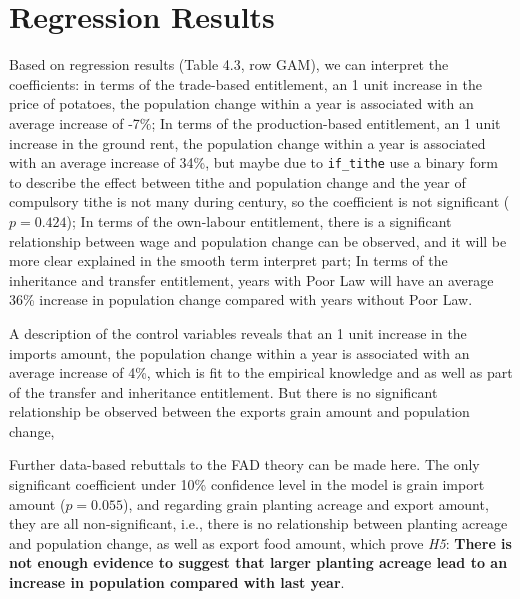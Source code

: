 \section{Regression Results}

Based on regression results (Table 4.3, row GAM), we can interpret the coefficients: in terms of the trade-based entitlement, an 1 unit increase in the price of potatoes, the population change within a year is associated with an average increase of -7\%; In terms of the production-based entitlement, an 1 unit increase in the ground rent, the population change within a year is associated with an average increase of 34\%, but maybe due to \texttt{if\_tithe} use a binary form to describe the effect between tithe and population change and the year of compulsory tithe is not many during century, so the coefficient is not significant ($p=0.424$); In terms of the own-labour entitlement, there is a significant relationship between wage and population change can be observed, and it will be more clear explained in the smooth term interpret part; In terms of the inheritance and transfer entitlement, years with Poor Law will have an average 36\% increase in population change compared with years without Poor Law. 

A description of the control variables reveals that an 1 unit increase in the imports amount, the population change within a year is associated with an average increase of 4\%, which is fit to the empirical knowledge and as well as part of the transfer and inheritance entitlement. But there is no significant relationship be observed between the exports grain amount and population change,

Further data-based rebuttals to the FAD theory can be made here. The only significant coefficient under 10\% confidence level in the model is grain import amount ($p=0.055$), and regarding grain planting acreage and export amount, they are all non-significant, i.e., there is no relationship between planting acreage and population change, as well as export food amount, which prove \textit{H5}: \textbf{There is not enough evidence to suggest that larger planting acreage lead to an increase in population compared with last year}. 

